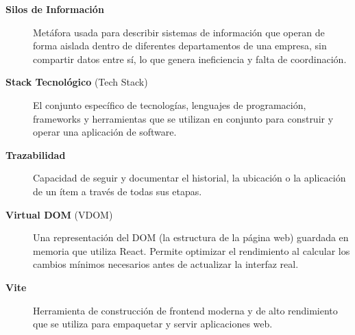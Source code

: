 \documentclass[12pt,letterpaper,spanish]{report}
\begin{document}
\begin{description}
  \item[\textbf{Silos de Información}] Metáfora usada para describir sistemas de información que operan de forma aislada dentro de diferentes departamentos de una empresa, sin compartir datos entre sí, lo que genera ineficiencia y falta de coordinación.

    \item[\textbf{Stack Tecnológico} (Tech Stack)] El conjunto específico de tecnologías, lenguajes de programación, frameworks y herramientas que se utilizan en conjunto para construir y operar una aplicación de software.

  \item[\textbf{Trazabilidad}] Capacidad de seguir y documentar el historial, la ubicación o la aplicación de un ítem a través de todas sus etapas.

  \item[\textbf{Virtual DOM} (VDOM)] Una representación del DOM (la estructura de la página web) guardada en memoria que utiliza React. Permite optimizar el rendimiento al calcular los cambios mínimos necesarios antes de actualizar la interfaz real.

  \item[\textbf{Vite}] Herramienta de construcción de frontend moderna y de alto rendimiento que se utiliza para empaquetar y servir aplicaciones web.

\end{description}


\end{document}
